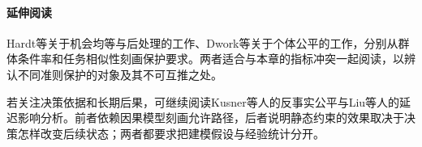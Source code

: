 \paragraph{延伸阅读}

Hardt等关于机会均等与后处理的工作、Dwork等关于个体公平的工作，分别从群体条件率和任务相似性刻画保护要求。两者适合与本章的指标冲突一起阅读，以辨认不同准则保护的对象及其不可互推之处。

若关注决策依据和长期后果，可继续阅读Kusner等人的反事实公平与Liu等人的延迟影响分析。前者依赖因果模型刻画允许路径，后者说明静态约束的效果取决于决策怎样改变后续状态；两者都要求把建模假设与经验统计分开。
